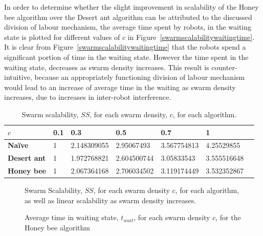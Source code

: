 In order to determine whether the slight improvement in scalability of the Honey bee algorithm over the Desert ant algorithm can be attributed to the discussed division of labour mechanism, the average time spent by robots, in the waiting state is plotted for different values of $c$ in Figure~\ref{swarmscalabilitywaitingtime}. It is clear from Figure~\ref{swarmscalabilitywaitingtime} that the robots spend a significant portion of time in the waiting state. However the time spent in the waiting state, decreases as swarm density increases. This result is counter-intuitive, because an appropriately functioning division of labour mechanism would lead to an increase of average time in the waiting as swarm density increases, due to increases in inter-robot interference. 


\begin{table}[]
\centering
\caption{Swarm scalability, $SS$, for each swarm density, $c$, for each algorithm.}
\label{table:swarmscalability}
\begin{tabular}{@{}lllllll@{}}
\toprule
\textbf{$c$}            & \textbf{0.1} & \textbf{0.3}         & \textbf{0.5}         & \textbf{0.7}         & \textbf{1}           \\ \midrule
\textbf{Na\"ive}    & 1   & 2.148309055 & 2.95067493  & 3.567754813 & 4.25529855  \\
\textbf{Desert ant} & 1   & 1.972768821 & 2.604500744 & 3.05833543  & 3.555516648 \\
\textbf{Honey bee}  & 1   & 2.067364168 & 2.706034502 & 3.119174449 & 3.532352867 \\ \bottomrule
\end{tabular}
\end{table}

\begin{figure}[!htb]
\centering
\small
\resizebox{\textwidth}{!}{}
\caption{Swarm Scalability, $SS$, for each swarm density $c$, for each algorithm, as well as linear scalability as swarm density increases.}
\label{fig:swarmscalability}
\end{figure}

\begin{figure}[!htb]
\centering
\small
\resizebox{\textwidth}{!}{}
\caption{Average time in waiting state, $t_{wait}$, for each swarm density $c$, for the Honey bee algorithm}
\label{fig:swarmscalabilitywaitingtime}
\end{figure}

